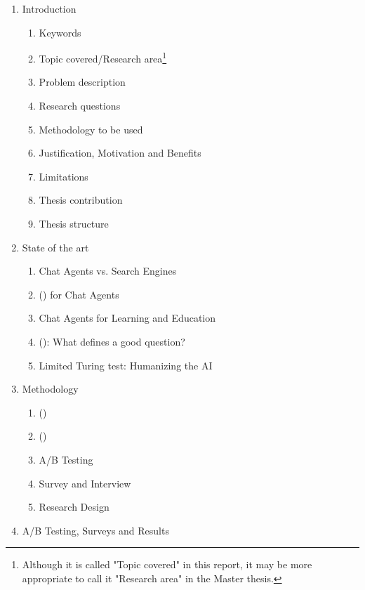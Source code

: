 \begin{enumerate}[label*=\arabic*.]
	\item Introduction	
	\begin{enumerate}[label*=\arabic*.]
		\item Keywords
		\item Topic covered/Research area\footnote{Although it is called "Topic covered" in this report, it may be more appropriate to call it "Research area" in the Master thesis.}
		\item Problem description
		\item Research questions
		\item Methodology to be used
		\item Justification, Motivation and Benefits
		\item Limitations
		\item Thesis contribution
		\item Thesis structure
	\end{enumerate}
	\item State of the art
	\begin{enumerate}[label*=\arabic*.]
		\item Chat Agents vs. Search Engines
		\item {} () for Chat Agents
		\item Chat Agents for Learning and Education
		\item {} (): What defines a good question?
		\item Limited Turing test: Humanizing the AI
	\end{enumerate}
	\item Methodology
	\begin{enumerate}[label*=\arabic*.]
		\item {} ()
		\item {} ()
		\item A/B Testing
		\item Survey and Interview
		\item Research Design 
	\end{enumerate}
	\item A/B Testing, Surveys and Results
	\begin{enumerate}[label*=\arabic*.]

\end{enumerate}
\end{enumerate}
